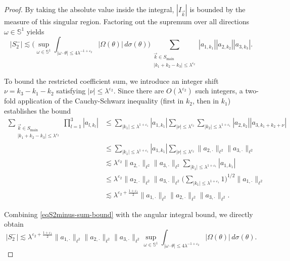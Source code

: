 \documentclass[11pt]{amsart}
\begin{document}
\begin{proof}
	By taking the absolute value inside the integral, $|I_{\vec k}|$ is bounded by the measure of this singular region. Factoring out the supremum over all directions $\omega \in \mathbb{S}^1$ yields
	\[
	|S_2^-| \lesssim \Bigg( \sup_{\omega\in\mathbb S^1} \int_{|\omega\cdot \theta|\le 4\lambda^{-1+\varepsilon_2}} |\Omega(\theta)|\,d\sigma(\theta) \Bigg) \sum_{\substack{\vec{k} \in S_{\text{main}} \\ |k_1+k_2-k_3| \le \lambda^{\varepsilon_2}}} |a_{1,k_1}| |a_{2,k_2}| |a_{3,k_3}|.
	\]
	
	To bound the restricted coefficient sum, we introduce an integer shift $\nu = k_3 - k_1 - k_2$ satisfying $|\nu| \le \lambda^{\varepsilon_2}$. Since there are $O(\lambda^{\varepsilon_2})$ such integers, a two-fold application of the Cauchy-Schwarz inequality (first in $k_2$, then in $k_1$) establishes the bound
	\begin{align}
		\sum_{\substack{\vec{k} \in S_{\text{main}} \\ |k_1+k_2-k_3| \le \lambda^{\varepsilon_2}}} \prod_{l=1}^3 |a_{l,k_l}| 
		&\le \sum_{|k_1| \le \lambda^{1+\varepsilon_1}} |a_{1,k_1}| \sum_{|\nu| \le \lambda^{\varepsilon_2}} \sum_{|k_2| \le \lambda^{1+\varepsilon_1}} |a_{2,k_2}| |a_{3,k_1+k_2+\nu}| \nonumber \\
		&\le \sum_{|k_1| \le \lambda^{1+\varepsilon_1}} |a_{1,k_1}| \sum_{|\nu| \le \lambda^{\varepsilon_2}} \|a_{2,\cdot}\|_{\ell^2} \|a_{3,\cdot}\|_{\ell^2} \nonumber \\
		&\lesssim \lambda^{\varepsilon_2} \|a_{2,\cdot}\|_{\ell^2} \|a_{3,\cdot}\|_{\ell^2} \sum_{|k_1| \le \lambda^{1+\varepsilon_1}} |a_{1,k_1}| \nonumber \\
		&\le \lambda^{\varepsilon_2} \|a_{2,\cdot}\|_{\ell^2} \|a_{3,\cdot}\|_{\ell^2} \Big( \sum_{|k_1| \le \lambda^{1+\varepsilon_1}} 1 \Big)^{1/2} \|a_{1,\cdot}\|_{\ell^2} \nonumber \\
		&\lesssim \lambda^{\varepsilon_2 + \frac{1+\varepsilon_1}{2}} \|a_{1,\cdot}\|_{\ell^2} \|a_{2,\cdot}\|_{\ell^2} \|a_{3,\cdot}\|_{\ell^2}. \label{eqS2minus-sum-bound}
	\end{align}
	
	Combining \eqref{eqS2minus-sum-bound} with the angular integral bound, we directly obtain
	\begin{equation}\label{eqS2minus-pre}
		|S_2^-| \lesssim \lambda^{\varepsilon_2+\frac{1+\varepsilon_1}{2}} \|a_{1,\cdot}\|_{\ell^2}\|a_{2,\cdot}\|_{\ell^2}\|a_{3,\cdot}\|_{\ell^2} \sup_{\omega\in\mathbb S^1} \int_{|\omega\cdot \theta|\le 4\lambda^{-1+\varepsilon_2}} |\Omega(\theta)|\,d\sigma(\theta).
	\end{equation}
	

\end{proof}
\end{document}
